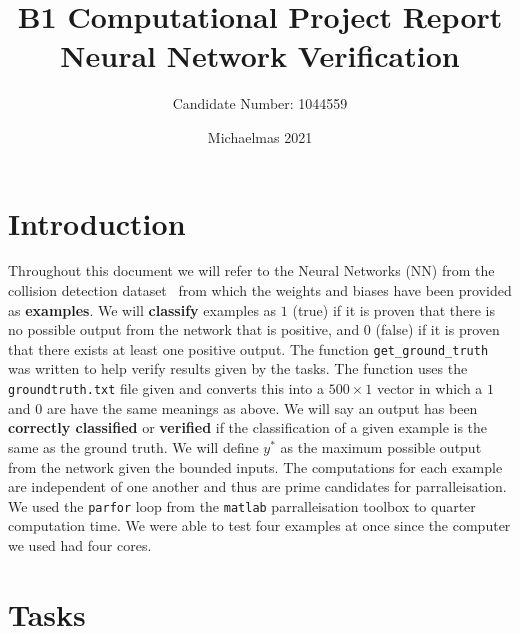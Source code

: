 \documentclass[11pt]{article}
\title{B1 Computational Project Report \\ Neural Network Verification} %
\author{Candidate Number: 1044559} %
\date{Michaelmas 2021} %
\begin{document}
\maketitle %




\section{Introduction}
Throughout this document we will refer to the Neural Networks (NN) from the collision detection dataset~\cite{DBLP:journals/corr/Ehlers17} from which the weights and biases have been provided as \textbf{examples}.
We will \textbf{classify} examples as $1$ (true) if it is proven that there is no possible output from the network that is positive, and $0$ (false) if it is proven that there exists at least one positive output.
The function \texttt{get\_ground\_truth} was written to help verify results given by the tasks. 
The function uses the \texttt{groundtruth.txt} file given and converts this into a $500\times1$ vector in which a $1$ and $0$ are have the same meanings as above.
We will say an output has been \textbf{correctly classified} or \textbf{verified} if the classification of a given example is the same as the ground truth.
We will define $y^*$ as the maximum possible output from the network given the bounded inputs.
The computations for each example are independent of one another and thus are prime candidates for parralleisation.
We used the \texttt{parfor} loop from the \texttt{matlab} parralleisation toolbox to quarter computation time.
We were able to test four examples at once since the computer we used had four cores.
\section{Tasks}
\end{document}
